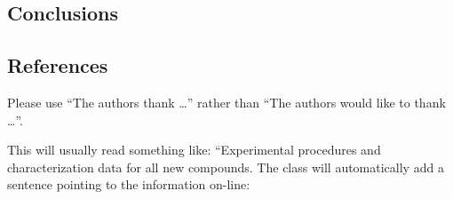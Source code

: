 \documentclass[journal=jacsat,manuscript=article]{achemso}
\newcommand*\sref[1]{%
    S\ref{#1}}
\begin{document}

\subsection{Conclusions}



\subsection{References}



\begin{acknowledgement}

Please use ``The authors thank \ldots'' rather than ``The
authors would like to thank \ldots''.


\end{acknowledgement}

\begin{suppinfo}

This will usually read something like: ``Experimental procedures and
characterization data for all new compounds. The class will
automatically add a sentence pointing to the information on-line:

\end{suppinfo}


\end{document}
